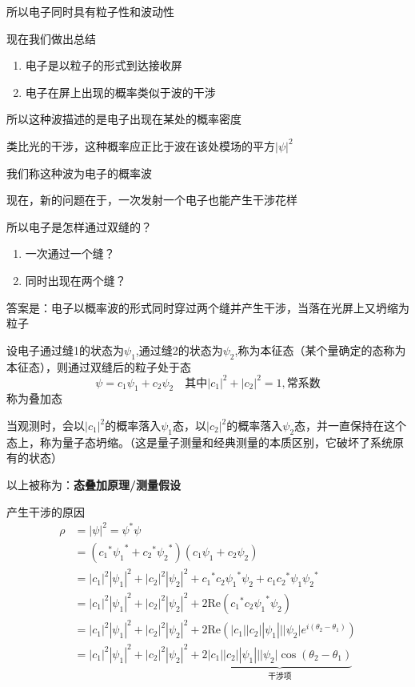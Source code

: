 \documentclass[lang=cn,10pt]{elegantbook}
\begin{document}
所以电子同时具有粒子性和波动性

现在我们做出总结
\begin{enumerate}
	\item 电子是以粒子的形式到达接收屏
	\item 电子在屏上出现的概率类似于波的干涉
\end{enumerate}
所以这种波描述的是电子出现在某处的概率密度

类比光的干涉，这种概率应正比于波在该处模场的平方$|\psi|^2$

我们称这种波为电子的概率波

现在，新的问题在于，一次发射一个电子也能产生干涉花样

所以电子是怎样通过双缝的？
\begin{enumerate}
	\item 一次通过一个缝？
	\item 同时出现在两个缝？
\end{enumerate}
答案是：电子以概率波的形式同时穿过两个缝并产生干涉，当落在光屏上又坍缩为粒子

设电子通过缝1的状态为$\psi_1$,通过缝2的状态为$\psi_2$,称为本征态（某个量确定的态称为本征态），则通过双缝后的粒子处于态
\begin{equation}
	\psi=c_1\psi_1+c_2\psi_2\quad\text{其中}|c_1|^2+|c_2|^2=1,\text{常系数}
\end{equation}
称为叠加态

当观测时，会以$|c_1|^2$的概率落入$\psi_1$态，以$|c_2|^2$的概率落入$\psi_2$态，并一直保持在这个态上，称为量子态坍缩。（这是量子测量和经典测量的本质区别，它破坏了系统原有的状态）

以上被称为：\textbf{态叠加原理/测量假设}

产生干涉的原因
\begin{equation}
	\begin{split}
		\rho &=|\psi |^2=\psi ^*\psi 
		\\
		&=\left( {c_1}^*{\psi _1}^*+{c_2}^*{\psi _2}^* \right) \left( c_1\psi _1+c_2\psi _2 \right) 
		\\
		&=|c_1|^2|\psi _1|^2+|c_2|^2|\psi _2|^2+{c_1}^*c_2{\psi _1}^*\psi _2+c_1{c_2}^*\psi _1{\psi _2}^*
		\\
		&=|c_1|^2|\psi _1|^2+|c_2|^2|\psi _2|^2+2\mathrm{Re}\left( {c_1}^*c_2{\psi _1}^*\psi _2 \right) 
		\\
		&=|c_1|^2|\psi _1|^2+|c_2|^2|\psi _2|^2+2\mathrm{Re}\left( |c_1||c_2||\psi _1|||\psi _2|e^{i\left( \theta _2-\theta _1 \right)} \right) 
		\\
		&=|c_1|^2|\psi _1|^2+|c_2|^2|\psi _2|^2+2\underset{\text{干涉项}}{\underbrace{|c_1||c_2||\psi _1|||\psi _2|\cos \left( \theta _2-\theta _1 \right) }}
	\end{split}
\end{equation}
\end{document}

